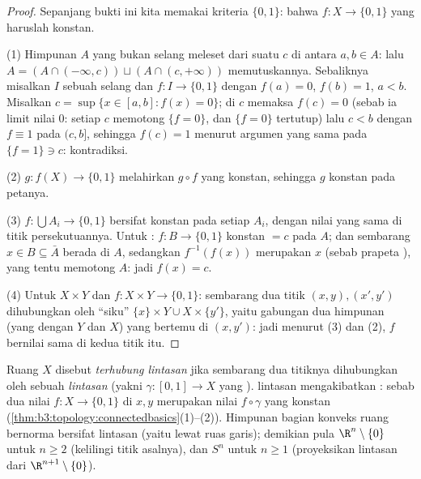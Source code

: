 \begin{proof}
Sepanjang bukti ini kita memakai kriteria $\{0,1\}$: bahwa $f \colon X \to
\{0,1\}$ yang  haruslah konstan.

(1) Himpunan $A$ yang bukan selang meleset dari suatu $c$ di antara $a, b \in A$:
lalu $A = (A \cap (-\infty, c)) \sqcup (A \cap (c, +\infty))$
memutuskannya. Sebaliknya misalkan $I$ sebuah selang dan $f \colon I
\to \{0,1\}$  dengan $f(a) = 0$, $f(b) = 1$, $a < b$.
Misalkan $c = \sup\{x \in [a,b] : f(x) = 0\}$;  di $c$
memaksa $f(c) = 0$ (sebab ia limit nilai $0$: setiap 
$c$ memotong $\{f = 0\}$, dan $\{f=0\}$ tertutup) lalu $c < b$
dengan $f \equiv 1$ pada $(c, b]$, sehingga $f(c) = 1$ menurut
argumen  yang sama pada $\{f = 1\} \ni c$: kontradiksi.

(2)  $g \colon f(X) \to \{0,1\}$ melahirkan $g \circ f$
yang konstan, sehingga $g$ konstan pada petanya.

(3)  $f\colon \bigcup A_i \to \{0,1\}$ bersifat konstan
pada setiap $A_i$, dengan nilai yang sama di titik persekutuannya. Untuk
: $f \colon B \to \{0,1\}$ konstan $= c$ pada $A$; dan sembarang
$x \in B \subseteq \bar A$ berada di  $A$, sedangkan $f^{-1}
(f(x))$ merupakan  $x$ (sebab prapeta ), yang tentu
memotong $A$: jadi $f(x) = c$.

(4) Untuk $X \times Y$ dan $f\colon X\times Y \to \{0,1\}$: sembarang
dua titik $(x,y), (x',y')$ dihubungkan oleh ``siku''
$\{x\}\times Y \cup X \times \{y'\}$, yaitu gabungan dua himpunan 
(yang  dengan $Y$ dan $X$) yang bertemu di $(x, y')$: jadi menurut (3) dan
(2), $f$ bernilai sama di kedua titik itu.
\end{proof}

\begin{definition}\label{def:b3:topology:pathconnected}
Ruang $X$ disebut \emph{terhubung lintasan} jika sembarang
dua titiknya dihubungkan oleh sebuah \emph{lintasan} (yakni $\gamma
\colon [0,1] \to X$ yang ).  lintasan mengakibatkan : sebab dua
nilai  $f \colon X \to \{0,1\}$ di $x, y$ merupakan
nilai $f\circ\gamma$ yang konstan
(\cref{thm:b3:topology:connectedbasics}(1)--(2)). Himpunan bagian konveks
ruang bernorma bersifat  lintasan (yaitu lewat ruas garis); demikian pula $\R^n
\setminus \{0\}$ untuk $n \geq 2$ (kelilingi titik asalnya), dan
$S^n$ untuk $n \geq 1$ (proyeksikan lintasan dari $\R^{n+1}\setminus
\{0\}$).
\end{definition}

